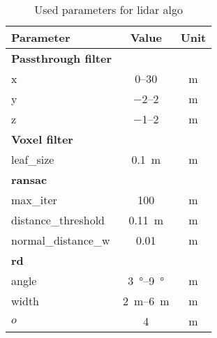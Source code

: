 \begin{table}[H]
    \centering
    \caption{Used parameters for lidar algo}
    \label{tab:full_lidar_algo_params}
    \begin{tabular}[t]{lcc}
        \toprule
        \textbf{Parameter}  & \textbf{Value}          & \textbf{Unit} \\
        \midrule
        \textbf{Passthrough filter}                                   \\
        x                   & \SIrange{0}{30}{}       & \si{\metre}   \\
        y                   & \SIrange{-2}{2}{}       & \si{\metre}   \\
        z                   & \SIrange{-1}{2}{}       & \si{\metre}   \\
        \midrule
        \textbf{Voxel filter}                                         \\
        leaf\_size          & \SI{0.1}{\metre}        & \si{\metre}   \\
        \midrule
        \textbf{\acrshort{ransac}}                                    \\
        max\_iter           & 100                     & \si{\metre}   \\
        distance\_threshold & \SI{0.11}{\metre}       & \si{\metre}   \\
        normal\_distance\_w & 0.01                    & \si{\metre}   \\
        \midrule
        \textbf{rd}                                                   \\
        angle               & \SIrange{3}{9}{\degree} & \si{\metre}   \\
        width               & \SIrange{2}{6}{\metre}  & \si{\metre}   \\
        $o$                 & 4                       & \si{\metre}   \\
        \bottomrule
    \end{tabular}
\end{table}